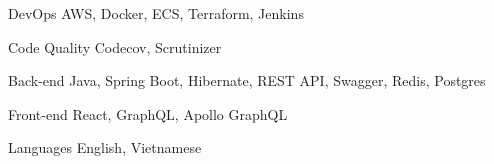 

\begin{cvskills}

  \cvskill
    {DevOps} %
    {AWS, Docker, ECS, Terraform, Jenkins} %
    
  \cvskill
    {Code Quality} %
    { Codecov, Scrutinizer} %

  \cvskill
    {Back-end} %
    {Java, Spring Boot, Hibernate, REST API, Swagger, Redis, Postgres} %

  \cvskill
    {Front-end} %
    {React, GraphQL, Apollo GraphQL } %


  \cvskill
    {Languages} %
    {English, Vietnamese} %

\end{cvskills}
